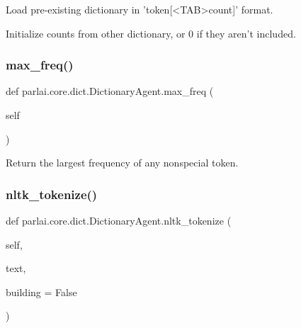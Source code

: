 \begin{DoxyVerb}Load pre-existing dictionary in 'token[<TAB>count]' format.

Initialize counts from other dictionary, or 0 if they aren't included.
\end{DoxyVerb}
 \mbox{\label{classparlai_1_1core_1_1dict_1_1DictionaryAgent_a3c3ef6181e0cea58b2650af763db1d17}} 
\subsubsection{\texorpdfstring{max\+\_\+freq()}{max\_freq()}}
{\footnotesize\ttfamily def parlai.\+core.\+dict.\+Dictionary\+Agent.\+max\+\_\+freq (\begin{DoxyParamCaption}\item[{}]{self }\end{DoxyParamCaption})}

\begin{DoxyVerb}Return the largest frequency of any nonspecial token.
\end{DoxyVerb}
 \mbox{\label{classparlai_1_1core_1_1dict_1_1DictionaryAgent_a73fe72e257ace6e8debf2c41995f8390}} 
\subsubsection{\texorpdfstring{nltk\+\_\+tokenize()}{nltk\_tokenize()}}
{\footnotesize\ttfamily def parlai.\+core.\+dict.\+Dictionary\+Agent.\+nltk\+\_\+tokenize (\begin{DoxyParamCaption}\item[{}]{self,  }\item[{}]{text,  }\item[{}]{building = {\ttfamily False} }\end{DoxyParamCaption})}

